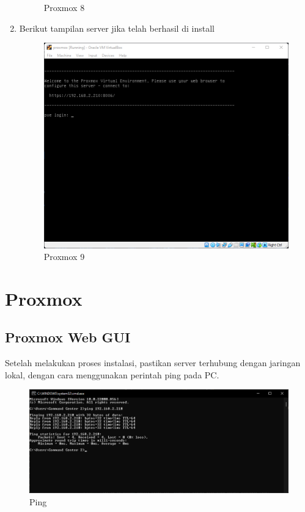 \documentclass{article}
\begin{document}
\begin{enumerate}
\begin{figure}[h!]
      \caption{Proxmox 8}
    \end{figure}
    \item Berikut tampilan server jika telah berhasil di install
    \begin{figure}[h!]
      \centering
      \includegraphics[width=0.7\linewidth]{proxmox 9.png}
      \caption{Proxmox 9}
    \end{figure}
  \end{enumerate}
  \newpage

  \section{Proxmox}
  \subsection{Proxmox Web GUI}
  Setelah melakukan proses instalasi, pastikan server terhubung dengan jaringan lokal,
  dengan cara menggunakan perintah ping pada PC.
  \begin{figure}[h!]
    \centering
    \includegraphics[width=0.7\linewidth]{cmd.png}
    \caption{Ping}
  \end{figure}
\end{document}
